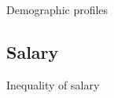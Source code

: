 \documentclass[12pt]{beamer}
\begin{document}
\begin{frame}{\textcolor{bscuro}{Demographic profiles}}
	\begin{figure}[!ht] 
		\centering
	\end{figure}
\end{frame}

\subsection{Salary} 


\begin{frame}{\textcolor{bscuro}{Inequality of salary}}	
	\begin{figure}[!ht] 
		\centering
	\end{figure}
\end{frame}
	
\end{document}
